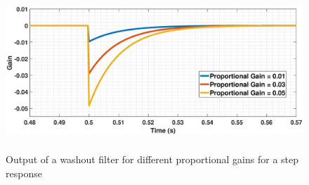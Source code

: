 \begin{figure}[H]
\centering
    \includegraphics[height = 6cm,width = 14.5cm]{Diagrams/Chapter_3/Washout_gain_output.eps}
    \caption{Output of a washout filter for different proportional gains for a step response}
    \label{fig:Washout_gain_output}
\end{figure}

